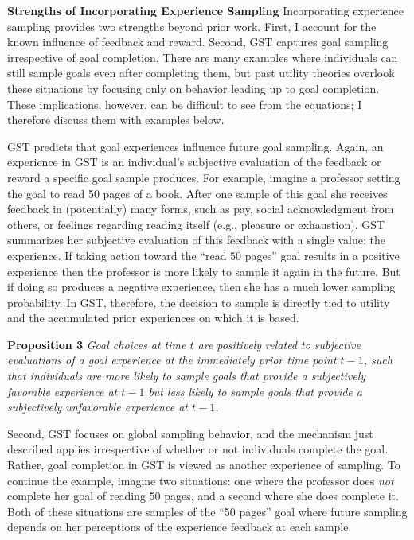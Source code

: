 \documentclass[english,man]{apa6}
\theoremstyle{definition}
\theoremstyle{definition}
\theoremstyle{definition}
\theoremstyle{remark}
\begin{document}
\textbf{Strengths of Incorporating Experience Sampling} Incorporating
experience sampling provides two strengths beyond prior work. First, I
account for the known influence of feedback and reward. Second, GST
captures goal sampling irrespective of goal completion. There are many
examples where individuals can still sample goals even after completing
them, but past utility theories overlook these situations by focusing
only on behavior leading up to goal completion. These implications,
however, can be difficult to see from the equations; I therefore discuss
them with examples below.

GST predicts that goal experiences influence future goal sampling.
Again, an experience in GST is an individual's subjective evaluation of
the feedback or reward a specific goal sample produces. For example,
imagine a professor setting the goal to read 50 pages of a book. After
one sample of this goal she receives feedback in (potentially) many
forms, such as pay, social acknowledgment from others, or feelings
regarding reading itself (e.g., pleasure or exhaustion). GST summarizes
her subjective evaluation of this feedback with a single value: the
experience. If taking action toward the \enquote{read 50 pages} goal
results in a positive experience then the professor is more likely to
sample it again in the future. But if doing so produces a negative
experience, then she has a much lower sampling probability. In GST,
therefore, the decision to sample is directly tied to utility and the
accumulated prior experiences on which it is based.

\textbf{Proposition 3} \emph{Goal choices at time \(t\) are positively
related to subjective evaluations of a goal experience at the
immediately prior time point \(t - 1\), such that individuals are more
likely to sample goals that provide a subjectively favorable experience
at \(t - 1\) but less likely to sample goals that provide a subjectively
unfavorable experience at \(t - 1\).}

Second, GST focuses on global sampling behavior, and the mechanism just
described applies irrespective of whether or not individuals complete
the goal. Rather, goal completion in GST is viewed as another experience
of sampling. To continue the example, imagine two situations: one where
the professor does \emph{not} complete her goal of reading 50 pages, and
a second where she does complete it. Both of these situations are
samples of the \enquote{50 pages} goal where future sampling depends on
her perceptions of the experience feedback at each sample.
\end{document}

